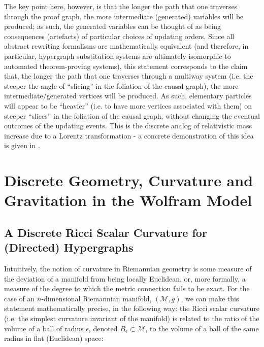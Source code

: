 \documentclass{article}
\begin{document}
The key point here, however, is that the longer the path that one traverses through the proof graph, the more intermediate (generated) variables will be produced; as such, the generated variables can be thought of as being consequences (artefacts) of particular choices of updating orders. Since all abstract rewriting formalisms are mathematically equivalent (and therefore, in particular, hypergraph substitution systems are ultimately isomorphic to automated theorem-proving systems), this statement corresponds to the claim that, the longer the path that one traverses through a multiway system (i.e. the steeper the angle of ``slicing'' in the foliation of the causal graph), the more intermediate/generated vertices will be produced. As such, elementary particles will appear to be ``heavier'' (i.e. to have more vertices associated with them) on steeper ``slices'' in the foliation of the causal graph, without changing the eventual outcomes of the updating events. This is the discrete analog of relativistic mass increase due to a Lorentz transformation - a concrete demonstration of this idea is given in \cite{wolfram_new}.

\section{Discrete Geometry, Curvature and Gravitation in the Wolfram Model}

\subsection{A Discrete Ricci Scalar Curvature for (Directed) Hypergraphs}
\label{sec:CurrentStatus5}

Intuitively, the notion of curvature in Riemannian geometry is some measure of the deviation of a manifold from being locally Euclidean, or, more formally, a measure of the degree to which the metric connection fails to be exact. For the case of an $n$-dimensional Riemannian manifold, ${\left( \mathcal{M}, g \right)}$, we can make this statement mathematically precise, in the following way: the Ricci scalar curvature (i.e. the simplest curvature invariant of the manifold) is related to the ratio of the volume of a ball of radius ${\epsilon}$, denoted ${B_{\epsilon} \subset \mathcal{M}}$, to the volume of a ball of the same radius in flat (Euclidean) space\cite{ricci}:
\end{document}
